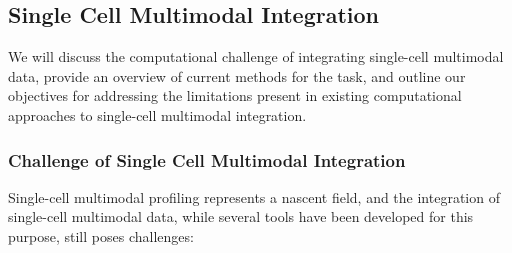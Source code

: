 
\subsection{Single Cell Multimodal Integration}
We will discuss the computational challenge of integrating single-cell multimodal data, provide an overview of current methods for the task, and outline our objectives for addressing the limitations present in existing computational approaches to single-cell multimodal integration.
\subsubsection{Challenge of Single Cell Multimodal Integration}
\label{background:sec2:challenge_integration}
Single-cell multimodal profiling represents a nascent field, and the integration of single-cell multimodal data, while several tools have been developed for this purpose, still poses challenges:

